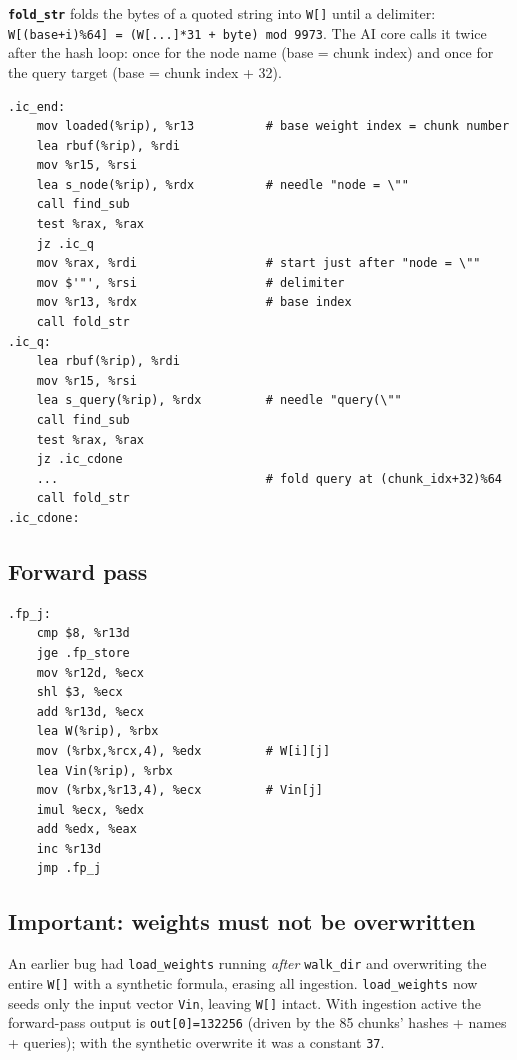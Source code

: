 \textbf{\texttt{fold\_str}} folds the bytes of a quoted string into
\texttt{W[]} until a delimiter: \texttt{W[(base+i)\%64] = (W[...]*31 +
byte) mod 9973}.  The AI core calls it twice after the hash loop: once for
the node name (base = chunk index) and once for the query target (base =
chunk index + 32).

\begin{lstlisting}[language=SakumAsm,caption={Content scan in ingest\_chunk (sakum\_ai.s:789).}]
.ic_end:
    mov loaded(%rip), %r13          # base weight index = chunk number
    lea rbuf(%rip), %rdi
    mov %r15, %rsi
    lea s_node(%rip), %rdx          # needle "node = \""
    call find_sub
    test %rax, %rax
    jz .ic_q
    mov %rax, %rdi                  # start just after "node = \""
    mov $'"', %rsi                  # delimiter
    mov %r13, %rdx                  # base index
    call fold_str
.ic_q:
    lea rbuf(%rip), %rdi
    mov %r15, %rsi
    lea s_query(%rip), %rdx         # needle "query(\""
    call find_sub
    test %rax, %rax
    jz .ic_cdone
    ...                             # fold query at (chunk_idx+32)%64
    call fold_str
.ic_cdone:
\end{lstlisting}

\subsection{Forward pass}

\begin{lstlisting}[language=SakumAsm,caption={8x8 dot product (forward\_pass, sakum\_ai.s:860).}]
.fp_j:
    cmp $8, %r13d
    jge .fp_store
    mov %r12d, %ecx
    shl $3, %ecx
    add %r13d, %ecx
    lea W(%rip), %rbx
    mov (%rbx,%rcx,4), %edx         # W[i][j]
    lea Vin(%rip), %rbx
    mov (%rbx,%r13,4), %ecx         # Vin[j]
    imul %ecx, %edx
    add %edx, %eax
    inc %r13d
    jmp .fp_j
\end{lstlisting}

\subsection{Important: weights must not be overwritten}

An earlier bug had \texttt{load\_weights} running \emph{after}
\texttt{walk\_dir} and overwriting the entire \texttt{W[]} with a synthetic
formula, erasing all ingestion.  \texttt{load\_weights} now seeds only the
input vector \texttt{Vin}, leaving \texttt{W[]} intact.  With ingestion
active the forward-pass output is \texttt{out[0]=132256} (driven by the 85
chunks' hashes + names + queries); with the synthetic overwrite it was a
constant \texttt{37}.


